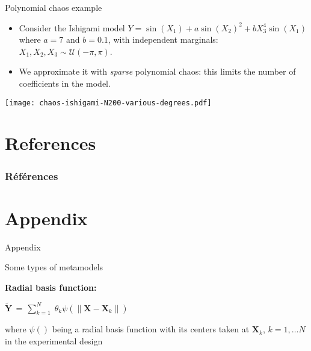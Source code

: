 \documentclass{beamer}
\begin{document}
\begin{frame}[t]{Polynomial chaos example}

\begin{example}
\begin{itemize}
\item Consider the Ishigami model $Y  = \sin(X_1) + a \sin(X_2)^2 + b X_3^4 \sin(X_1)$
where $a=7$ and $b=0.1$, with independent marginals: $X_1,X_2,X_3 \sim \mathcal{U}(-\pi, \pi)$.

\item We approximate it with \emph{sparse} polynomial chaos: this limits 
the number of coefficients in the model.
\end{itemize}

\end{example}

\begin{center}
 \texttt{[image: chaos-ishigami-N200-various-degrees.pdf]}
\end{center}

\end{frame}


\section{References}
\begin{frame}[allowframebreaks]
\frametitle{Références}
\nocite{*}


\end{frame}


\section{Appendix}
\begin{frame}
\begin{center}
Appendix
\end{center}
\end{frame}


\begin{frame}[t]{Some types of metamodels}

{\bf Radial basis function:}
\begin{center}
$\displaystyle{ \tilde{\boldsymbol{Y}} }\,  = \, 
\sum_{k = 1}^{N}  \; \theta_{k} \psi( \left\lVert \boldsymbol{X} - \boldsymbol{X}_k \right\rVert)   $
\end{center}
where $\psi()$ being a radial basis function with its centers taken at $\boldsymbol{X}_k$, $k = 1, \dots N$ in the experimental design

\end{frame}
\end{document}
